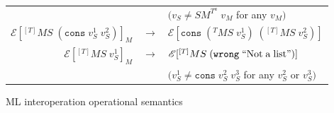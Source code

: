 \begin{figure}
\begin{center}
\begin{tabular}{rcl}
&& $(v_{S}\neq SM^{T^{a}}\;v_{M}$ for any $v_{M})$ \\
$\mathscr{E}[^{[T]}MS\;(\mathtt{cons}\;v_{S}^{1}\;v_{S}^{2})]_{M}$ & $\rightarrow$ & $\mathscr{E}[\mathtt{cons}\;(^{T}MS\;v_{S}^{1})\;(^{[T]}MS\;v_{S}^{2})]$ \\
$\mathscr{E}[^{[T]}MS\;v_{S}^{1}]_{M}$ & $\rightarrow$ & $\mathscr{E}[^{[T]}MS\;(\mathtt{wrong}\;\mathrm{``Not\;a\;list"})]$ \\
&& $(v_{S}^{1}\neq\mathtt{cons}\;v_{S}^{2}\;v_{S}^{3}$ for any $v_{S}^{2}$ or $v_{S}^{3})$
\end{tabular}
\end{center}
\caption{ML interoperation operational semantics}
\label{fig:mios}
\end{figure}